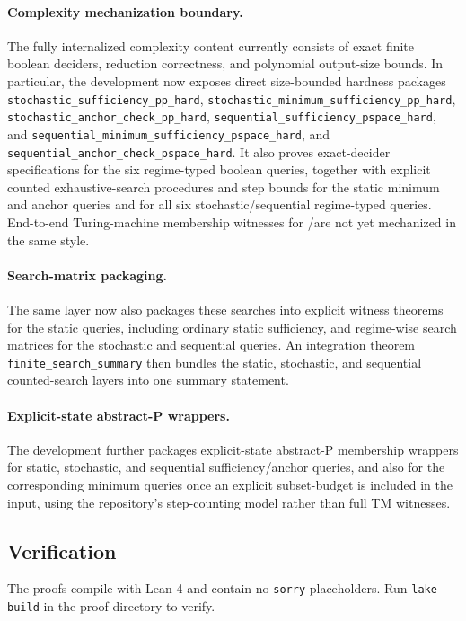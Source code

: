 \paragraph{Complexity mechanization boundary.}
The fully internalized complexity content currently consists of exact finite
boolean deciders, reduction correctness, and polynomial output-size bounds. In
particular, the development now exposes direct size-bounded hardness packages
\texttt{stochastic\_sufficiency\_pp\_hard},
\texttt{stochastic\_minimum\_sufficiency\_pp\_hard},
\texttt{stochastic\_anchor\_check\_pp\_hard},
\texttt{sequential\_sufficiency\_pspace\_hard}, and
\texttt{sequential\_minimum\_sufficiency\_pspace\_hard}, and
\texttt{sequential\_anchor\_check\_pspace\_hard}. It also proves exact-decider
specifications for the six regime-typed boolean queries, together with explicit
counted exhaustive-search procedures and step bounds for the static minimum and
anchor queries and for all six stochastic/sequential regime-typed queries.
End-to-end
Turing-machine membership witnesses for \PP/\PSPACE are not yet mechanized in
the same style.

\paragraph{Search-matrix packaging.}
The same layer now also packages these searches into explicit witness theorems
for the static queries, including ordinary static sufficiency, and regime-wise
search matrices for the stochastic and sequential queries. An integration theorem
\texttt{finite\_search\_summary} then bundles the static, stochastic, and
sequential counted-search layers into one summary statement.

\paragraph{Explicit-state abstract-\textsc{P} wrappers.}
The development further packages explicit-state abstract-\textsc{P} membership
wrappers for static, stochastic, and sequential sufficiency/anchor queries,
and also for the corresponding minimum queries once an explicit subset-budget is
included in the input, using the repository's step-counting model rather than
full TM witnesses.

\subsection{Verification}

The proofs compile with Lean 4 and contain no \texttt{sorry} placeholders. Run \texttt{lake build} in the proof directory to verify.
